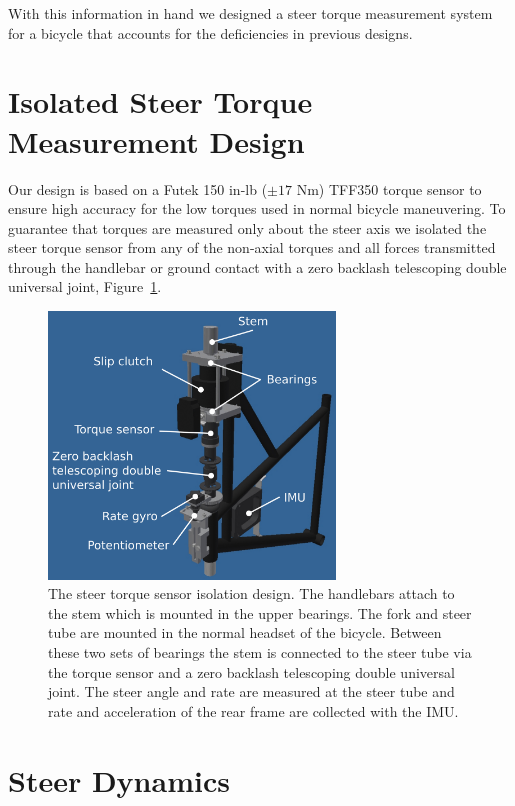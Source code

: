 \documentclass[a4paper]{article}
\begin{document}
With this information in hand we designed a steer torque measurement system for
a bicycle that accounts for the deficiencies in previous designs.

\section*{Isolated Steer Torque Measurement Design}

Our design is based on a Futek 150 in-lb ($\pm 17$ Nm) TFF350 torque sensor to
ensure high accuracy for the low torques used in normal bicycle maneuvering.
To guarantee that torques are measured only about the steer axis we isolated
the steer torque sensor from any of the non-axial torques and all forces
transmitted through the handlebar or ground contact with a zero backlash
telescoping double universal joint, Figure~\ref{fig:steer-torque-design}.

\begin{figure}
  \centering
  \includegraphics[width=3in]{figures/steer-torque-design.png}
  \caption{The steer torque sensor isolation design. The handlebars attach to
    the stem which is mounted in the upper bearings. The fork and steer tube
    are mounted in the normal headset of the bicycle. Between these two sets of
    bearings the stem is connected to the steer tube via the torque sensor and a
    zero backlash telescoping double universal joint. The steer angle and rate
    are measured at the steer tube and rate and acceleration of the rear frame
    are collected with the IMU.}
  \label{fig:steer-torque-design}
\end{figure}

\section*{Steer Dynamics}
\label{sec:steer-dynamics}
\end{document}
